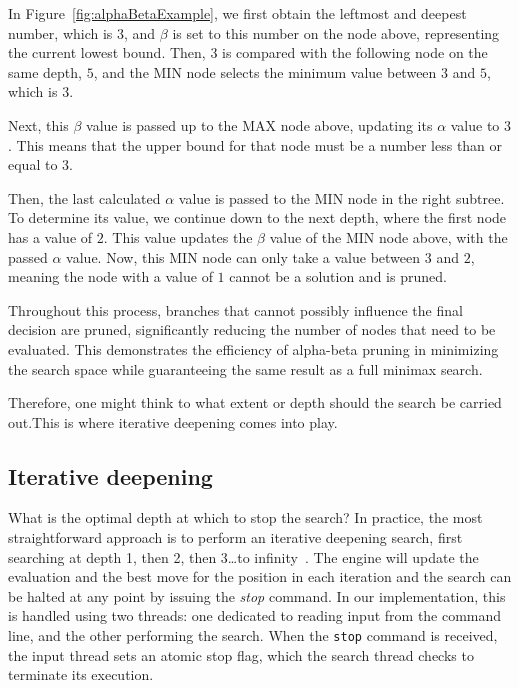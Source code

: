 \noindent In Figure~\ref{fig:alphaBetaExample}, we first obtain the leftmost and deepest number, which is $3$, and $\beta$ is set to this number on the node above, representing the current lowest bound. Then, $3$ is compared with the following node on the same depth, $5$, and the MIN node selects the minimum value between $3$ and $5$, which is $3$.

\vspace{1em}

\noindent Next, this $\beta$ value is passed up to the MAX node above, updating its $\alpha$ value to $3$. This means that the upper bound for that node must be a number less than or equal to $3$.

\vspace{1em}

\noindent Then, the last calculated $\alpha$ value is passed to the MIN node in the right subtree. To determine its value, we continue down to the next depth, where the first node has a value of $2$. This value updates the $\beta$ value of the MIN node above, with the passed $\alpha$ value. Now, this MIN node can only take a value between $3$ and $2$, meaning the node with a value of $1$ cannot be a solution and is pruned.

\vspace{1em}

\noindent Throughout this process, branches that cannot possibly influence the final decision are pruned, significantly reducing the number of nodes that need to be evaluated. This demonstrates the efficiency of alpha-beta pruning in minimizing the search space while guaranteeing the same result as a full minimax search.

\vspace{1em}

\noindent Therefore, one might think to what extent or depth should the search be carried out.This is where iterative deepening comes into play.

\subsection{Iterative deepening}
\label{chap:iterativeDeepening}

What is the optimal depth at which to stop the search? In practice, the most straightforward approach is to perform an iterative deepening search, first searching at depth 1, then 2, then 3\ldots to infinity~\cite{IterativeDeepening}. The engine will update the evaluation and the best move for the position in each iteration and the search can be halted at any point by issuing the \textit{stop} command. In our implementation, this is handled using two threads: one dedicated to reading input from the command line, and the other performing the search. When the \texttt{stop} command is received, the input thread sets an atomic stop flag, which the search thread checks to terminate its execution.

